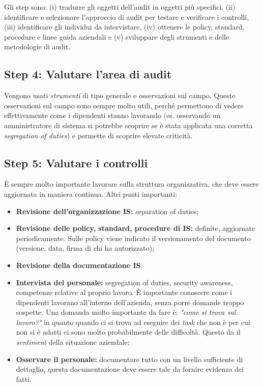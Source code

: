 Gli step sono: (i) tradurre gli oggetti dell'audit in oggetti più specifici,
(ii) identificare e selezionare l'approccio di audit per testare e verificare i
controlli, (iii) identificare gli individui da intervistare, (iv) ottenere le
policy, standard, procedure e linee guida aziendali e (v) sviluppare degli
strumenti e delle metodologie di audit.

\subsection{Step 4: Valutare l'area di audit}

Vengono usati \textit{strumenti} di tipo generale e osservazioni sul campo.
Queste osservazioni sul campo sono sempre molto utili, perché permettono di
vedere effettivamente come i dipendenti stanno lavorando (es. osservando
un amministratore di sistema si potrebbe scoprire se è stata applicata una
corretta \textit{segregation of duties}) e permette di scoprire elevate
criticità.

\subsection{Step 5: Valutare i controlli}

È sempre molto importante lavorare sulla struttura organizzativa, che deve
essere aggiornata in maniera continua.
Altri punti importanti:
\begin{itemize}
\item \textbf{Revisione dell'organizzazione IS:} separation of duties;
\item \textbf{Revisione delle policy, standard, procedure di IS:} definite,
aggiornate periodicamente. Sulle policy viene indicato il versionamento del
documento (versione, data, firma di chi ha autorizzato);
\item \textbf{Revisione della documentazione IS};
\item \textbf{Intervista del personale:} segregation of duties, security
awareness, competenze relative al proprio lavoro. È importante conoscere come i
dipendenti lavorano all'interno dell'azienda, senza porre domande troppo
sospette. Una domanda molto importante da fare è: \textit{"come si trova sul
lavoro?"} in quanto quando ci si trova ad eseguire dei \textit{task} che non è
per cui non si è adatti ci sono molto probabilmente delle difficoltà. Questo da
il \textit{sentiment} della situazione aziendale;
\item \textbf{Osservare il personale:} documentare tutto con un livello
sufficiente di dettaglio, questa documentazione deve essere tale
da fornire evidenza dei fatti.
\end{itemize}



